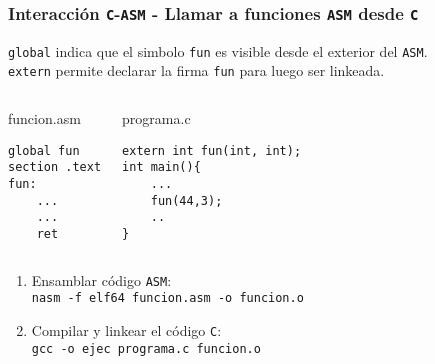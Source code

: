 \documentclass[aspectratio=169]{beamer}
\begin{document}
\begin{frame}[fragile]
\frametitle{Interacción \texttt{C}-\texttt{ASM} - \textbf{Llamar a funciones \texttt{ASM} desde \texttt{C}}}
\small
\texttt{global} indica que el simbolo \texttt{fun} es visible desde el exterior del \texttt{ASM}.\\
\texttt{extern} permite declarar la firma \texttt{fun} para luego ser linkeada.\\
\normalsize
\medskip
\begin{columns}
\column{2.0in}
\begin{block}{funcion.asm}
\vspace{-0.5cm}
\begin{verbatim}
global fun
section .text
fun:
    ...
    ...
    ret
\end{verbatim}
\vspace{-0.3cm}
\end{block}
\column{2.0in}
\begin{block}{programa.c}
\vspace{-0.5cm}
\begin{verbatim}
extern int fun(int, int);
int main(){
    ...
    fun(44,3);
    ..
}
\end{verbatim}
\vspace{-0.3cm}
\end{block}
\end{columns}
\pause
\medskip
\begin{enumerate}
 \item Ensamblar código \texttt{ASM}:\\
 \texttt{nasm -f elf64 funcion.asm -o funcion.o}
 \item Compilar y linkear el código \texttt{C}:\\
 \texttt{gcc -o ejec programa.c funcion.o}
\end{enumerate}
\end{frame}
\end{document}
